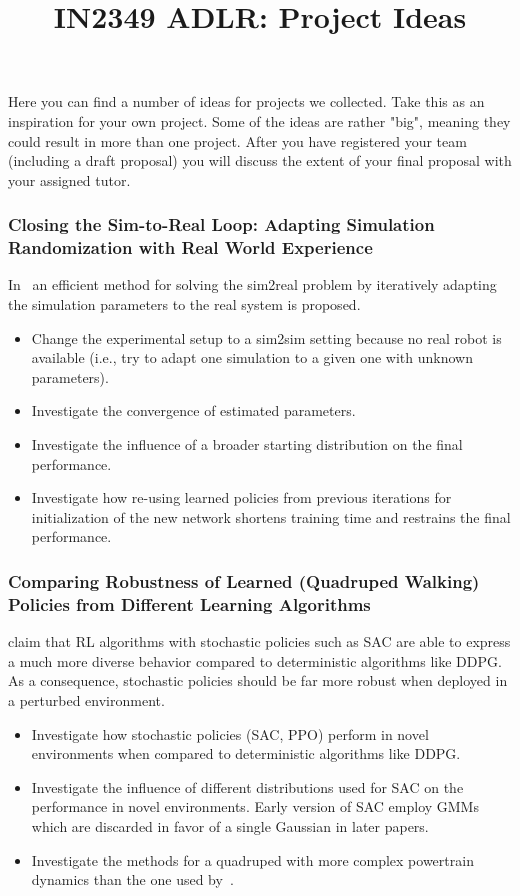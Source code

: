 \documentclass[a4paper]{article}
\title{IN2349 ADLR: Project Ideas}
\begin{document}
\maketitle

Here you can find a number of ideas for projects we collected. Take this as an inspiration for your own project. Some of the ideas are rather "big", meaning they could result in more than one project. After you have registered your team (including a draft proposal) you will discuss the extent of your final proposal with your assigned tutor.

\subsubsection{Closing the Sim-to-Real Loop: Adapting Simulation Randomization with Real World Experience}
In~\cite{Chebotar2018} an efficient method for solving the sim2real problem by iteratively adapting the simulation parameters to the real system is proposed.
\begin{itemize}
\item Change the experimental setup to a sim2sim setting because no real robot is available (i.e., try to adapt one simulation to a given one with unknown parameters).
\item Investigate the convergence of estimated parameters.
\item Investigate the influence of a broader starting distribution on the final performance.
\item Investigate how re-using learned policies from previous iterations for initialization of the new network shortens training time and restrains the final performance. 
\end{itemize}

\subsubsection{Comparing Robustness of Learned (Quadruped Walking) Policies from Different Learning Algorithms}
\cite{Haarnoja2018b} claim that RL algorithms with stochastic policies such as SAC are able to express a much more diverse behavior compared to deterministic algorithms like DDPG. As a consequence, stochastic policies should be far more robust when deployed in a perturbed environment.
\begin{itemize}
\item Investigate how stochastic policies (SAC, PPO) perform in novel environments when compared to deterministic algorithms like DDPG.
\item Investigate the influence of different distributions used for SAC on the performance in novel environments. Early version of SAC employ GMMs which are discarded in favor of a single Gaussian in later papers.
\item Investigate the methods for a quadruped with more complex powertrain dynamics than the one used by~\cite{Haarnoja2018b}.
\end{itemize}
\end{document}
